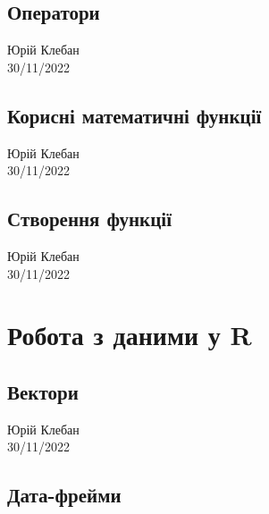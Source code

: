 \documentclass[
  letterpaper,
  DIV=11,
  numbers=noendperiod]{scrreprt}
\begin{document}
\hypertarget{ux43eux43fux435ux440ux430ux442ux43eux440ux438}{%
\chapter{Оператори}\label{ux43eux43fux435ux440ux430ux442ux43eux440ux438}}

Юрій Клебан\\
30/11/2022

\hfill\break

\hypertarget{ux43aux43eux440ux438ux441ux43dux456-ux43cux430ux442ux435ux43cux430ux442ux438ux447ux43dux456-ux444ux443ux43dux43aux446ux456ux457}{%
\chapter{Корисні математичні
функції}\label{ux43aux43eux440ux438ux441ux43dux456-ux43cux430ux442ux435ux43cux430ux442ux438ux447ux43dux456-ux444ux443ux43dux43aux446ux456ux457}}

Юрій Клебан\\
30/11/2022

\hfill\break

\hypertarget{ux441ux442ux432ux43eux440ux435ux43dux43dux44f-ux444ux443ux43dux43aux446ux456ux457}{%
\chapter{Створення
функції}\label{ux441ux442ux432ux43eux440ux435ux43dux43dux44f-ux444ux443ux43dux43aux446ux456ux457}}

Юрій Клебан\\
30/11/2022

\hfill\break

\part{Робота з даними у R}

\hypertarget{ux432ux435ux43aux442ux43eux440ux438}{%
\chapter{Вектори}\label{ux432ux435ux43aux442ux43eux440ux438}}

Юрій Клебан\\
30/11/2022

\hfill\break

\hypertarget{ux434ux430ux442ux430-ux444ux440ux435ux439ux43cux438}{%
\chapter{Дата-фрейми}\label{ux434ux430ux442ux430-ux444ux440ux435ux439ux43cux438}}
\end{document}
